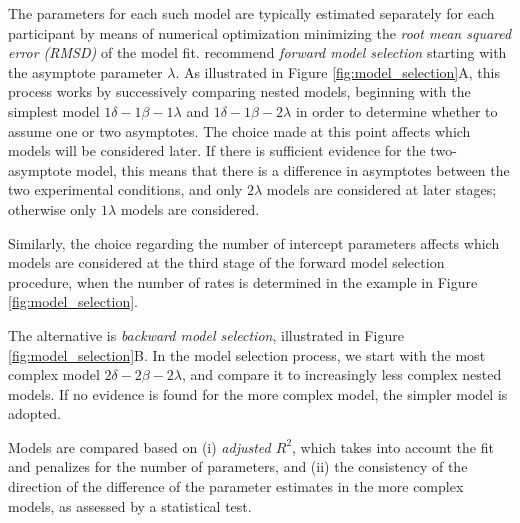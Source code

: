 \documentclass[10pt,letterpaper]{article}
\begin{document}
The parameters for each such model are typically estimated separately for each participant by means of numerical optimization minimizing the \textit{root mean squared error (RMSD)} of the model fit.  \cite{Foraker2018} recommend \textit{forward model selection} starting with the asymptote parameter $\lambda$. As illustrated in Figure \ref{fig:model_selection}A, this process works by successively comparing nested models, beginning with the simplest model \(1\delta-1\beta-1\lambda\) and \(1\delta-1\beta-2\lambda\) in order to determine whether to assume one or two asymptotes. The choice made at this point affects which models will be considered later. If there is sufficient evidence for the two-asymptote model, this means that there is a difference in asymptotes between the two experimental conditions, and only \(2\lambda\) models are considered at later stages; otherwise only \(1\lambda\) models are considered.

Similarly, the choice regarding the number of intercept parameters affects which models are considered at the third stage of the forward model selection procedure, when the number of rates is determined in the example in Figure \ref{fig:model_selection}.

The alternative is \textit{backward model selection}, illustrated in Figure \ref{fig:model_selection}B. In the model selection process, we start with the most complex model \(2\delta-2\beta-2\lambda\), and compare it to increasingly less complex nested models. If no evidence is found for the more complex model, the simpler model is adopted.

Models are compared based on (i) \textit{adjusted \(R^2\)}, which takes into account the fit and penalizes for the number of parameters, and (ii) the consistency of the direction of the difference of the parameter estimates in the more complex models, as assessed by a statistical test.
\end{document}
